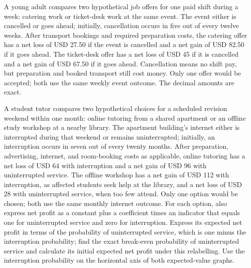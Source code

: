 A young adult compares two hypothetical job offers for one paid shift during a week:
catering work or ticket-desk work at the same event. The event either is cancelled or
goes ahead; initially, cancellation occurs in five out of every twelve weeks. After
transport bookings and required preparation costs, the catering offer has a net loss of
USD 27.50 if the event is cancelled and a net gain of USD 82.50 if it goes ahead. The
ticket-desk offer has a net loss of USD 45 if it is cancelled and a net gain of USD 67.50
if it goes ahead. Cancellation means no shift pay, but preparation and booked transport
still cost money. Only one offer would be accepted; both use the same weekly event outcome.
The decimal amounts are exact.

A student tutor compares two hypothetical choices for a scheduled revision weekend within
one month: online tutoring from a shared apartment or an offline study workshop at a
nearby library. The apartment building's internet either is interrupted during that
weekend or remains uninterrupted; initially, an interruption occurs in seven out of every
twenty months. After preparation, advertising, internet, and room-booking costs as
applicable, online tutoring has a net loss of USD 64 with interruption and a net gain of
USD 96 with uninterrupted service. The offline workshop has a net gain of USD 112 with
interruption, as affected students seek help at the library, and a net loss of USD 28
with uninterrupted service, when too few attend. Only one option would be chosen; both
use the same monthly internet outcome. For each option, also express net profit as a
constant plus a coefficient times an indicator that equals one for uninterrupted service
and zero for interruption. Express its expected net profit in terms of the probability of
uninterrupted service, which is one minus the interruption probability; find the exact
break-even probability of uninterrupted service and calculate its initial expected net profit
under this relabelling. Use the interruption probability on the horizontal axis of both
expected-value graphs.


